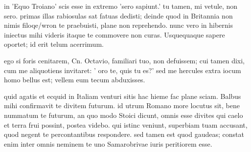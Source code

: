 


 in 'Equo Troiano' scis esse in extremo 'sero sapiunt.' tu tamen, mi vetule, non sero. primas illas rabiosulas sat fatuas dedisti; deinde quod in Britannia non nimis filoqe/wron te praebuisti, plane non reprehendo. nunc vero in hibernis iniectus mihi videris itaque te commovere non curas. Usquequaque sapere oportet; id erit telum acerrimum.

 ego si foris cenitarem, Cn. Octavio, familiari tuo, non defuissem; cui tamen dixi, cum me aliquotiens invitaret: ' oro te, quis tu es?' sed me hercules extra iocum homo bellus est; vellem eum tecum abduxisses.

 quid agatis et ecquid in Italiam venturi sitis hac hieme fac plane sciam. Balbus mihi confirmavit te divitem futurum. id utrum Romano more locutus sit, bene nummatum te futurum, an quo modo Stoici dicunt, omnis esse divites qui caelo et terra frui possint, postea videbo. qui istinc veniunt, superbiam tuam accusant, quod negent te percontantibus respondere. sed tamen est quod gaudeas; constat enim inter omnis neminem te uno Samarobrivae iuris peritiorem esse.
